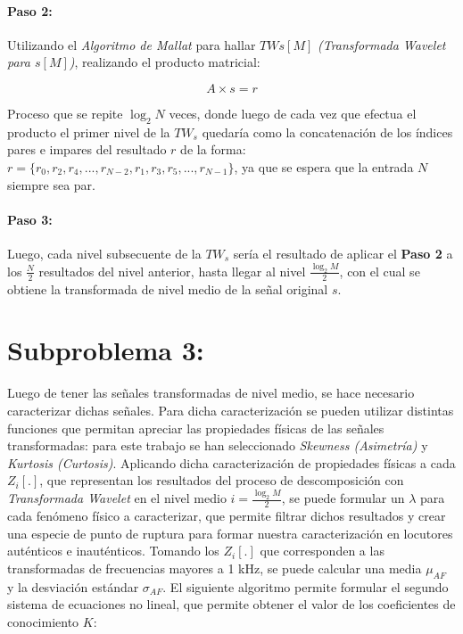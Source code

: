 \documentclass[11pt]{article}
\begin{document}
\paragraph*{Paso 2:}
Utilizando el {\it Algoritmo de Mallat} para hallar \(TW{s[M]}\) {\it (Transformada Wavelet para \(s[M]\))}, realizando el producto matricial:

\begin{equation}
    A \times s = r
\end{equation}

Proceso que se repite \(\log_{2}N\) veces, donde luego de cada vez que efectua el producto el primer nivel de la 
\(TW_{s}\) quedaría como la concatenación de los índices pares e impares del resultado \(r\) de la forma: \(r = \{r_{0}, r_{2}, r_{4}, ..., r_{N - 2}, r_{1}, r_{3}, r_{5}, ..., r_{N - 1}\}\), ya que se espera 
que la entrada \(N\) siempre sea par.

\paragraph*{Paso 3:}
Luego, cada nivel subsecuente de la \(TW_{s}\) sería el resultado de aplicar el {\bf Paso 2} a los \(\frac{N}{2}\) resultados del nivel anterior, hasta llegar al nivel \(\frac{\log_{2}M}{2}\), con el cual se obtiene la transformada de 
nivel medio de la señal original \(s\).


\section*{Subproblema 3:}
Luego de tener las señales transformadas de nivel medio, se hace necesario caracterizar dichas señales. Para dicha caracterización se pueden utilizar distintas funciones que permitan apreciar las propiedades físicas de las señales 
transformadas: para este trabajo se han seleccionado {\it Skewness (Asimetría)} y {\it Kurtosis (Curtosis)}. Aplicando dicha caracterización de propiedades físicas a cada \(Z_{i}[.]\), que representan los resultados del proceso de descomposición 
con {\it Transformada Wavelet} en el nivel medio \(i = \frac{\log_{2}M}{2}\), se puede formular un \(\lambda\) para cada fenómeno físico a caracterizar, que permite filtrar dichos resultados y crear una especie de punto de ruptura para formar nuestra caracterización en locutores auténticos e 
inauténticos. Tomando los \(Z_{i}[.]\) que corresponden a las transformadas de frecuencias mayores a 1 kHz, se puede calcular una media \(\mu_{AF}\) y la desviación estándar \(\sigma_{AF}\). El siguiente algoritmo permite formular el segundo 
sistema de ecuaciones no lineal, que permite obtener el valor de los coeficientes de conocimiento \(K\):
\end{document}
